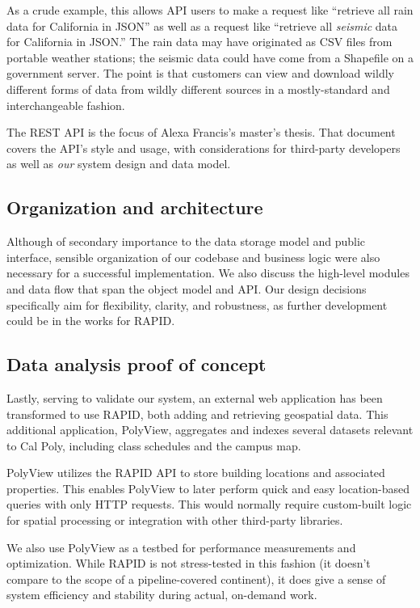 As a crude example, this allows API users to make a request like ``retrieve all rain data for California in JSON'' as well as a request like ``retrieve all \textit{seismic} data for California in JSON.'' The rain data may have originated as CSV files from portable weather stations; the seismic data could have come from a Shapefile on a government server. The point is that customers can view and download wildly different forms of data from wildly different sources in a mostly-standard and interchangeable fashion.

The REST API is the focus of Alexa Francis's master's thesis. That document covers the API's style and usage, with considerations for third-party developers as well as \textit{our} system design and data model.

\subsection{Organization and architecture}
Although of secondary importance to the data storage model and public interface, sensible organization of our codebase and business logic were also necessary for a successful implementation. We also discuss the high-level modules and data flow that span the object model and API. Our design decisions specifically aim for flexibility, clarity, and robustness, as further development could be in the works for RAPID.

\subsection{Data analysis proof of concept}
\label{polyview_intro}
Lastly, serving to validate our system, an external web application has been transformed to use RAPID, both adding and retrieving geospatial data. This additional application, PolyView, aggregates and indexes several datasets relevant to Cal Poly, including class schedules and the campus map.

PolyView utilizes the RAPID API to store building locations and associated properties. This enables PolyView to later perform quick and easy location-based queries with only HTTP requests. This would normally require custom-built logic for spatial processing or integration with other third-party libraries.

We also use PolyView as a testbed for performance measurements and optimization. While RAPID is not stress-tested in this fashion (it doesn't compare to the scope of a pipeline-covered continent), it does give a sense of system efficiency and stability during actual, on-demand work.

